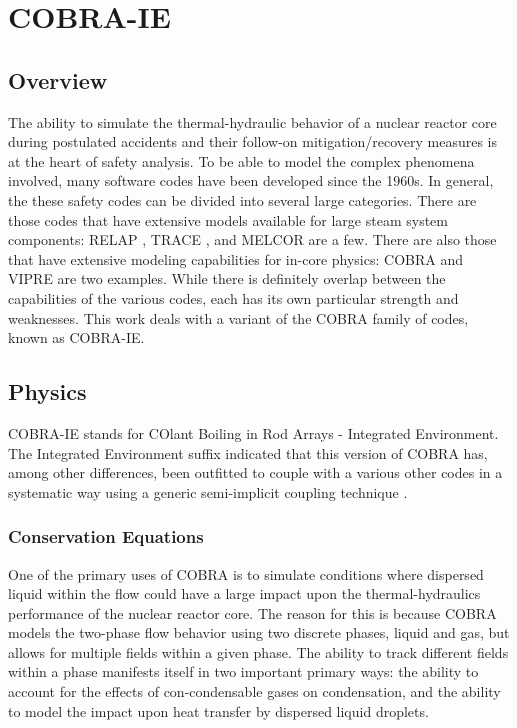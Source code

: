 \chapter{COBRA-IE}
\label{chap:cobra}

\section{Overview}
\label{sect:cobra_overview}
The ability to simulate the thermal-hydraulic behavior of a nuclear reactor core during postulated accidents and their follow-on mitigation/recovery measures is at the heart of safety analysis.
To be able to model the complex phenomena involved, many software codes have been developed since the 1960s.
In general, the these safety codes can be divided into several large categories. There are those codes that have extensive models available for large steam system components: RELAP \cite{RELAP}, TRACE \cite{TRACE}, and MELCOR are a few.
There are also those that have extensive modeling capabilities for in-core physics: COBRA \cite{Thurgood1983c} and VIPRE are two examples.
While there is definitely overlap between the capabilities of the various codes, each has its own particular strength and weaknesses.
This work deals with a variant of the COBRA family of codes, known as COBRA-IE.

\section{Physics}
\label{sect:cobra_physics}
COBRA-IE stands for COlant Boiling in Rod Arrays - Integrated Environment.
The Integrated Environment suffix indicated that this version of COBRA has, among other differences, been outfitted to couple with a various other codes in a systematic way using a generic semi-implicit coupling technique \cite{Weaver2002}.

\subsection{Conservation Equations}
One of the primary uses of COBRA is to simulate conditions where dispersed liquid within the flow could have a large impact upon the thermal-hydraulics performance of the nuclear reactor core.
The reason for this is because COBRA models the two-phase flow behavior using two discrete phases, liquid and gas, but allows for multiple fields within a given phase.
The ability to track different fields within a phase manifests itself in two important primary ways: the ability to account for the effects of con-condensable gases on condensation, and the ability to model the impact upon heat transfer by dispersed liquid droplets.


